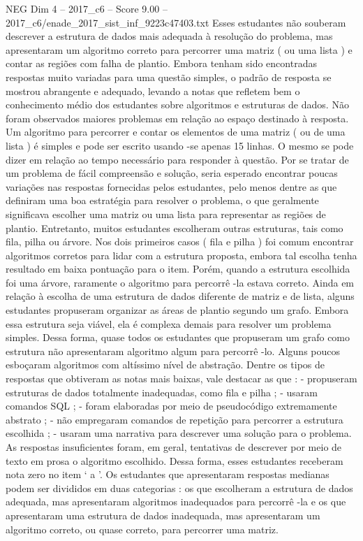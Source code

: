 \begin{textsample}{NEG Dim 4 – 2017\_c6 – Score 9.00 – 2017\_c6/enade\_2017\_sist\_inf\_9223c47403.txt}
Esses estudantes não souberam descrever a estrutura de dados mais adequada à resolução do problema, mas apresentaram um algoritmo correto para percorrer uma matriz ( ou uma lista ) e contar as regiões com falha de plantio.
Embora tenham sido encontradas respostas muito variadas para uma questão simples, o padrão de resposta se mostrou abrangente e adequado, levando a notas que refletem bem o conhecimento médio dos estudantes sobre algoritmos e estruturas de dados.
Não foram observados maiores problemas em relação ao espaço destinado à resposta.
Um algoritmo para percorrer e contar os elementos de uma matriz ( ou de uma lista ) é simples e pode ser escrito usando -se apenas 15 linhas.
O mesmo se pode dizer em relação ao tempo necessário para responder à questão.
Por se tratar de um problema de fácil compreensão e solução, seria esperado encontrar poucas variações nas respostas fornecidas pelos estudantes, pelo menos dentre as que definiram uma boa estratégia para resolver o problema, o que geralmente significava escolher uma matriz ou uma lista para representar as regiões de plantio.
Entretanto, muitos estudantes escolheram outras estruturas, tais como fila, pilha ou árvore.
Nos dois primeiros casos ( fila e pilha ) foi comum encontrar algoritmos corretos para lidar com a estrutura proposta, embora tal escolha tenha resultado em baixa pontuação para o item.
Porém, quando a estrutura escolhida foi uma árvore, raramente o algoritmo para percorrê -la estava correto.
Ainda em relação à escolha de uma estrutura de dados diferente de matriz e de lista, alguns estudantes propuseram organizar as áreas de plantio segundo um grafo.
Embora essa estrutura seja viável, ela é complexa demais para resolver um problema simples.
Dessa forma, quase todos os estudantes que propuseram um grafo como estrutura não apresentaram algoritmo algum para percorrê -lo.
Alguns poucos esboçaram algoritmos com altíssimo nível de abstração.
Dentre os tipos de respostas que obtiveram as notas mais baixas, vale destacar as que : - propuseram estruturas de dados totalmente inadequadas, como fila e pilha ; - usaram comandos SQL ; - foram elaboradas por meio de pseudocódigo extremamente abstrato ; - não empregaram comandos de repetição para percorrer a estrutura escolhida ; - usaram uma narrativa para descrever uma solução para o problema.
As respostas insuficientes foram, em geral, tentativas de descrever por meio de texto em prosa o algoritmo escolhido.
Dessa forma, esses estudantes receberam nota zero no item ‘ a ’.
Os estudantes que apresentaram respostas medianas podem ser divididos em duas categorias : os que escolheram a estrutura de dados adequada, mas apresentaram algoritmos inadequados para percorrê -la e os que apresentaram uma estrutura de dados inadequada, mas apresentaram um algoritmo correto, ou quase correto, para percorrer uma matriz.

\end{textsample}

